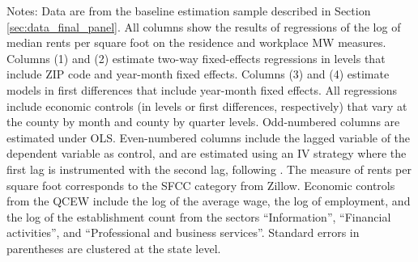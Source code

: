 \begin{table}[hbt!]
\begin{tabular}{@{}lcccc@{}}
    \end{tabular}

    \begin{minipage}{.95\textwidth} \footnotesize
        \vspace{2mm}
        Notes: 
        Data are from the baseline estimation sample described in Section 
        \ref{sec:data_final_panel}.
        All columns show the results of regressions of the log of median rents 
        per square foot on the residence and workplace MW measures.
        Columns (1) and (2) estimate two-way fixed-effects regressions in 
        levels that include ZIP code and year-month fixed effects.
        Columns (3) and (4) estimate models in first differences that include 
        year-month fixed effects.
        All regressions include economic controls (in levels or first differences,
        respectively) that vary at the county by month and county by quarter levels.
        Odd-numbered columns are estimated under OLS.
        Even-numbered columns include the lagged variable of the dependent variable
        as control, and are estimated using an IV strategy where the first lag is 
        instrumented with the second lag, following \textcite{ArellanoBond1991}.
        The measure of rents per square foot corresponds to the SFCC category 
        from Zillow.
        Economic controls from the QCEW include the log of the average wage, 
        the log of employment, and the log of the establishment count from the 
        sectors ``Information'', ``Financial activities'', and ``Professional
        and business services''.
        Standard errors in parentheses are clustered at the state level.
    \end{minipage}
\end{table}
